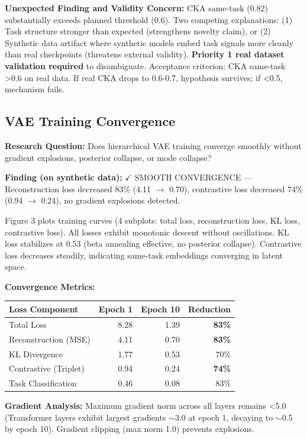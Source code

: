 \textbf{Unexpected Finding and Validity Concern:} CKA same-task (0.82) substantially exceeds planned threshold (0.6). Two competing explanations: (1) Task structure stronger than expected (strengthens novelty claim), or (2) Synthetic data artifact where synthetic models embed task signals more cleanly than real checkpoints (threatens external validity). \textbf{Priority 1 real dataset validation required} to disambiguate. Acceptance criterion: CKA same-task >0.6 on real data. If real CKA drops to 0.6-0.7, hypothesis survives; if <0.5, mechanism fails.

\subsection{VAE Training Convergence}

\textbf{Research Question:} Does hierarchical VAE training converge smoothly without gradient explosions, posterior collapse, or mode collapse?

\textbf{Finding (on synthetic data):} $\checkmark$ SMOOTH CONVERGENCE --- Reconstruction loss decreased 83\% (4.11 $\to$ 0.70), contrastive loss decreased 74\% (0.94 $\to$ 0.24), no gradient explosions detected.

Figure 3 plots training curves (4 subplots: total loss, reconstruction loss, KL loss, contrastive loss). All losses exhibit monotonic descent without oscillations. KL loss stabilizes at 0.53 (beta annealing effective, no posterior collapse). Contrastive loss decreases steadily, indicating same-task embeddings converging in latent space.

\textbf{Convergence Metrics:}

\begin{table}[h]
\centering
\begin{tabular}{lrrr}
\toprule
\textbf{Loss Component} & \textbf{Epoch 1} & \textbf{Epoch 10} & \textbf{Reduction} \\
\midrule
Total Loss & 8.28 & 1.39 & \textbf{83\%} \\
Reconstruction (MSE) & 4.11 & 0.70 & \textbf{83\%} \\
KL Divergence & 1.77 & 0.53 & 70\% \\
Contrastive (Triplet) & 0.94 & 0.24 & \textbf{74\%} \\
Task Classification & 0.46 & 0.08 & 83\% \\
\bottomrule
\end{tabular}
\end{table}

\textbf{Gradient Analysis:} Maximum gradient norm across all layers remains <5.0 (Transformer layers exhibit largest gradients $\sim$3.0 at epoch 1, decaying to $\sim$0.5 by epoch 10). Gradient clipping (max norm 1.0) prevents explosions.

